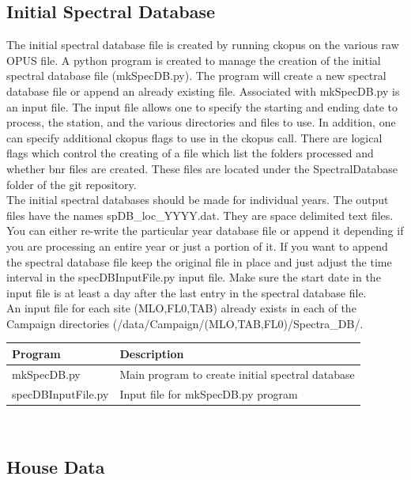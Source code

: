 \documentclass[12pt, letterpaper]{article}
\begin{document}
\subsection{Initial Spectral Database}
\label{sec:ISD}
The initial spectral database file is created by running ckopus on the various raw OPUS file. A python program is created to manage the creation of the initial spectral database file (mkSpecDB.py). The program will create a new spectral database file or append an already existing file. Associated with mkSpecDB.py is an input file. The input file allows one to specify the starting and ending date to process, the station, and the various directories and files to use. In addition, one can specify additional ckopus flags to use in the ckopus call. There are logical flags which control the creating of a file which list the folders processed and whether bnr files are created. These files are located under the SpectralDatabase folder of the git repository.\\

The initial spectral databases should be made for individual years. The output files have the names spDB\_loc\_YYYY.dat. They are space delimited text files. You can either re-write the particular year database file or append it depending if you are processing an entire year or just a portion of it. If you want to append the spectral database file keep the original file in place and just adjust the time interval in the specDBInputFile.py input file. Make sure the start date in the input file is at least a day after the last entry in the spectral database file.\\

An input file for each site (MLO,FL0,TAB) already exists in each of the Campaign directories (/data/Campaign/(MLO,TAB,FL0)/Spectra\_DB/.\\

\begin{tabular}{ l l }
\textbf{Program} & \textbf{Description} \\
\hline
mkSpecDB.py         & Main program to create initial spectral database \\
specDBInputFile.py  & Input file for mkSpecDB.py program               \\
\end{tabular} \\


\subsection{House Data}
\label{sec:HD}
\end{document}
